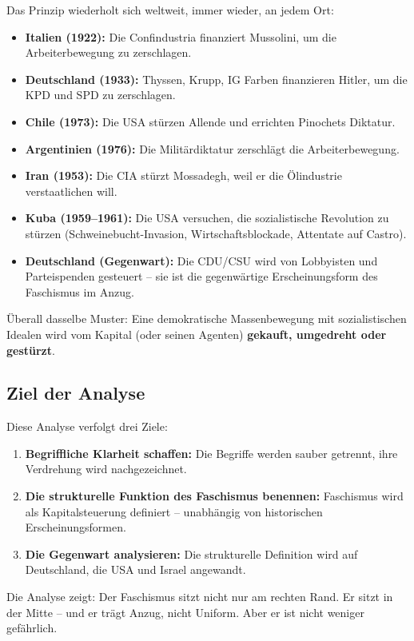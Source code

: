 Das Prinzip wiederholt sich weltweit, immer wieder, an jedem Ort:

\begin{itemize}
    \item \textbf{Italien (1922):} Die Confindustria finanziert Mussolini, um die Arbeiterbewegung zu zerschlagen.
    \item \textbf{Deutschland (1933):} Thyssen, Krupp, IG Farben finanzieren Hitler, um die KPD und SPD zu zerschlagen.
    \item \textbf{Chile (1973):} Die USA stürzen Allende und errichten Pinochets Diktatur.
    \item \textbf{Argentinien (1976):} Die Militärdiktatur zerschlägt die Arbeiterbewegung.
    \item \textbf{Iran (1953):} Die CIA stürzt Mossadegh, weil er die Ölindustrie verstaatlichen will.
    \item \textbf{Kuba (1959--1961):} Die USA versuchen, die sozialistische Revolution zu stürzen (Schweinebucht-Invasion, Wirtschaftsblockade, Attentate auf Castro).
    \item \textbf{Deutschland (Gegenwart):} Die CDU/CSU wird von Lobbyisten und Parteispenden gesteuert -- sie ist die gegenwärtige Erscheinungsform des Faschismus im Anzug.
\end{itemize}

Überall dasselbe Muster: Eine demokratische Massenbewegung mit sozialistischen Idealen wird vom Kapital (oder seinen Agenten) \textbf{gekauft, umgedreht oder gestürzt}.

\subsection{Ziel der Analyse}

Diese Analyse verfolgt drei Ziele:

\begin{enumerate}
    \item \textbf{Begriffliche Klarheit schaffen:} Die Begriffe werden sauber getrennt, ihre Verdrehung wird nachgezeichnet.
    \item \textbf{Die strukturelle Funktion des Faschismus benennen:} Faschismus wird als Kapitalsteuerung definiert -- unabhängig von historischen Erscheinungsformen.
    \item \textbf{Die Gegenwart analysieren:} Die strukturelle Definition wird auf Deutschland, die USA und Israel angewandt.
\end{enumerate}

Die Analyse zeigt: Der Faschismus sitzt nicht nur am rechten Rand. Er sitzt in der Mitte -- und er trägt Anzug, nicht Uniform. Aber er ist nicht weniger gefährlich.